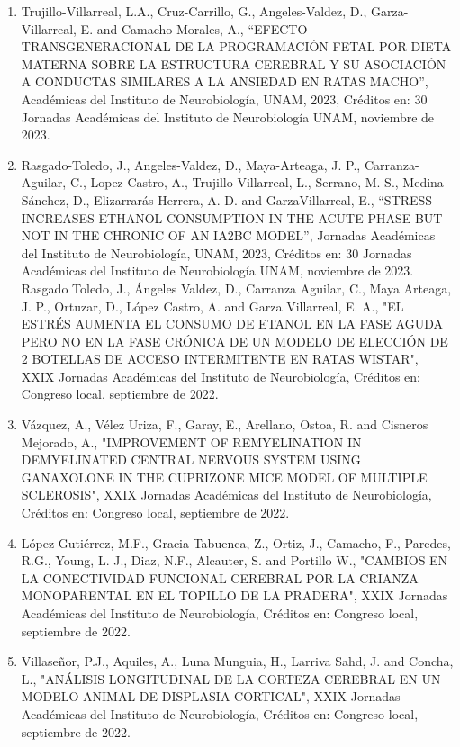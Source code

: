 \begin{enumerate}
\item Trujillo-Villarreal, L.A., Cruz-Carrillo, G., Angeles-Valdez, D., Garza-Villarreal, E. and Camacho-Morales, A., “EFECTO TRANSGENERACIONAL DE LA 
PROGRAMACIÓN 
FETAL POR DIETA MATERNA SOBRE LA ESTRUCTURA CEREBRAL Y SU ASOCIACIÓN A CONDUCTAS SIMILARES A LA ANSIEDAD EN RATAS MACHO”, Académicas del Instituto de 
Neurobiología, UNAM, 2023, Créditos en: 30 Jornadas Académicas del Instituto de Neurobiología UNAM, noviembre de 2023.

\item Rasgado-Toledo, J., Angeles-Valdez, D., Maya-Arteaga, J. P., Carranza-Aguilar, C., Lopez-Castro, A., Trujillo-Villarreal, L., Serrano, M. S., 
Medina-Sánchez, D., 
Elizarrarás-Herrera, A. D. and GarzaVillarreal, E., “STRESS INCREASES ETHANOL CONSUMPTION IN THE ACUTE PHASE BUT NOT IN THE CHRONIC OF AN IA2BC MODEL”, Jornadas 
Académicas del Instituto de Neurobiología, UNAM, 2023, Créditos en: 30 Jornadas Académicas del Instituto de Neurobiología UNAM, noviembre de 2023.
Rasgado Toledo, J., Ángeles Valdez, D., Carranza Aguilar, C., Maya Arteaga, J. P., Ortuzar, D., López Castro, A. and Garza Villarreal, E. A., "EL ESTRÉS AUMENTA 
EL CONSUMO DE ETANOL EN LA FASE AGUDA PERO NO EN LA FASE CRÓNICA DE UN MODELO DE ELECCIÓN DE 2 BOTELLAS DE ACCESO INTERMITENTE EN RATAS WISTAR", XXIX Jornadas 
Académicas del Instituto de Neurobiología, Créditos en: Congreso local, septiembre de 2022.

\item Vázquez, A., Vélez Uriza, F., Garay, E., Arellano, Ostoa, R. and Cisneros Mejorado, A., "IMPROVEMENT OF REMYELINATION IN DEMYELINATED CENTRAL NERVOUS 
SYSTEM 
USING GANAXOLONE IN THE CUPRIZONE MICE MODEL OF MULTIPLE SCLEROSIS", XXIX Jornadas Académicas del Instituto de Neurobiología, Créditos en: Congreso local, 
septiembre de 2022.

\item López Gutiérrez, M.F., Gracia Tabuenca, Z., Ortiz, J., Camacho, F., Paredes, R.G., Young, L. J., Diaz, N.F., Alcauter, S. and Portillo W., "CAMBIOS EN LA 
CONECTIVIDAD FUNCIONAL CEREBRAL POR LA CRIANZA MONOPARENTAL EN EL TOPILLO DE LA PRADERA", XXIX Jornadas Académicas del Instituto de Neurobiología, Créditos en: 
Congreso local, septiembre de 2022.

\item Villaseñor, P.J., Aquiles, A., Luna Munguia, H., Larriva Sahd, J. and Concha, L., "ANÁLISIS LONGITUDINAL DE LA CORTEZA CEREBRAL EN UN MODELO ANIMAL DE 
DISPLASIA 
CORTICAL", XXIX Jornadas Académicas del Instituto de Neurobiología, Créditos en: Congreso local, septiembre de 2022.


\end{enumerate}
